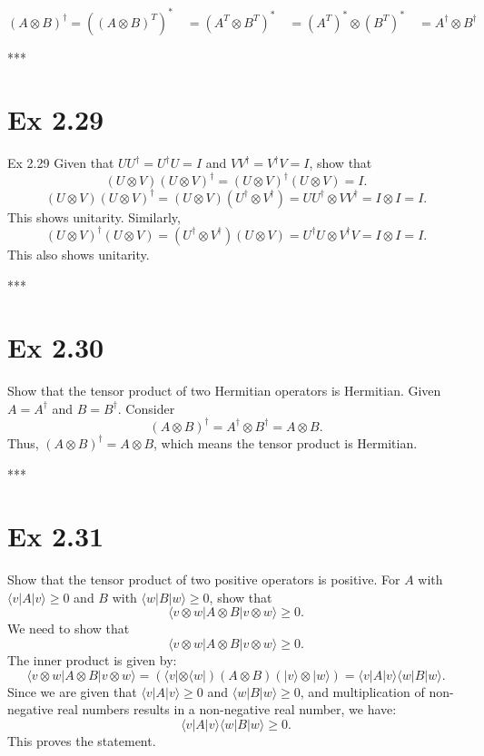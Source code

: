 \documentclass{article}
\newcommand{\0}{{$|0\rangle$}}
\newcommand{\1}{{$|1\rangle$}}
\begin{document}
$(A \otimes B)^\dag = ((A \otimes B)^T)^* \quad = (A^T \otimes B^T)^* \quad = (A^T)^* \otimes (B^T)^* \quad = A^\dag \otimes B^\dag$

***

\newpage
\section*{Ex 2.29 } 

Ex 2.29  
Given that $UU^\dagger = U^\dagger U = I$ and $VV^\dagger = V^\dagger V = I$, show that  
$$
(U \otimes V)(U \otimes V)^\dagger = (U \otimes V)^\dagger (U \otimes V) = I.
$$  
$$
(U \otimes V)(U \otimes V)^\dagger = (U \otimes V)(U^\dagger \otimes V^\dagger) = UU^\dagger \otimes VV^\dagger = I \otimes I = I.
$$  
This shows unitarity. Similarly,  
$$
(U \otimes V)^\dagger (U \otimes V) = (U^\dagger \otimes V^\dagger)(U \otimes V) = U^\dagger U \otimes V^\dagger V = I \otimes I = I.
$$  
This also shows unitarity.

***

\newpage
\section*{Ex 2.30 } 
Show that the tensor product of two Hermitian operators is Hermitian. Given $A = A^\dagger$ and $B = B^\dagger$. Consider  
$$
(A \otimes B)^\dagger = A^\dagger \otimes B^\dagger = A \otimes B.
$$  
Thus, $(A \otimes B)^\dagger = A \otimes B$, which means the tensor product is Hermitian.

***

\newpage
\section*{Ex 2.31 } 
Show that the tensor product of two positive operators is positive.
For $A$ with $\langle v|A|v \rangle \ge 0$ and $B$ with $\langle w|B|w \rangle \ge 0$, show that  
$$
\langle v \otimes w|A \otimes B|v \otimes w \rangle \ge 0.
$$  
We need to show that  
$$
\langle v \otimes w|A \otimes B|v \otimes w \rangle \ge 0.
$$  
The inner product is given by:  
$$
\langle v \otimes w|A \otimes B|v \otimes w \rangle = (\langle v| \otimes \langle w|)(A \otimes B)(|v \rangle \otimes |w \rangle) = \langle v|A|v \rangle \langle w|B|w \rangle.
$$  
Since we are given that $\langle v|A|v \rangle \ge 0$ and $\langle w|B|w \rangle \ge 0$, and multiplication of non-negative real numbers results in a non-negative real number, we have:  
$$
\langle v|A|v \rangle \langle w|B|w \rangle \ge 0.
$$  
This proves the statement.
\end{document}
